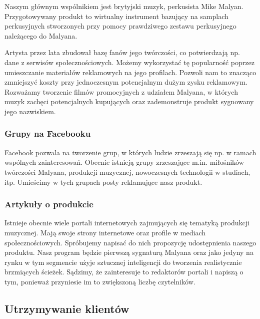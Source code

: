 \documentclass[12pt]{article}
\begin{document}
Naszym głównym wspólnikiem jest brytyjski muzyk, perkusista Mike Malyan.
Przygotowywany produkt to wirtualny instrument bazujący na samplach perkusyjnych stworzonych przy pomocy prawdziwego zestawu perkusyjnego należącego do Malyana.

Artysta przez lata zbudował bazę fanów jego twórczości, co potwierdzają np. dane z serwisów społecznościowych.
Możemy wykorzystać tę popularność poprzez umieszczanie materiałów reklamowych na jego profilach.
Pozwoli nam to znacząco zmniejszyć koszty przy jednoczesnym potencjalnym dużym zysku reklamowym.
Rozważamy tworzenie filmów promocyjnych z udziałem Malyana, w których muzyk zachęci potencjalnych kupujących oraz zademonstruje produkt sygnowany jego nazwiskiem.

\subsubsection{Grupy na Facebooku}

Facebook pozwala na tworzenie grup, w których ludzie zrzeszają się np. w ramach wspólnych zainteresowań.
Obecnie istnieją grupy zrzeszające m.in. miłośników twórczości Malyana, produkcji muzycznej, nowoczesnych technologii w studiach, itp.
Umieścimy w tych grupach posty reklamujące nasz produkt.

\subsubsection{Artykuły o produkcie}


Istnieje obecnie wiele portali internetowych zajmujących się tematyką produkcji muzycznej.
Mają swoje strony internetowe oraz profile w mediach społecznościowych.
Spróbujemy napisać do nich propozycję udostępnienia naszego produktu.
Nasz program będzie pierwszą sygnaturą Malyana oraz jako jedyny na rynku w tym segmencie użyje sztucznej inteligencji do tworzenia realistycznie brzmiących ścieżek.
Sądzimy, że zainteresuje to redaktorów portali i napiszą o tym, ponieważ przyniesie im to zwiększoną liczbę czytelników.

\subsection{Utrzymywanie klientów}
\end{document}

